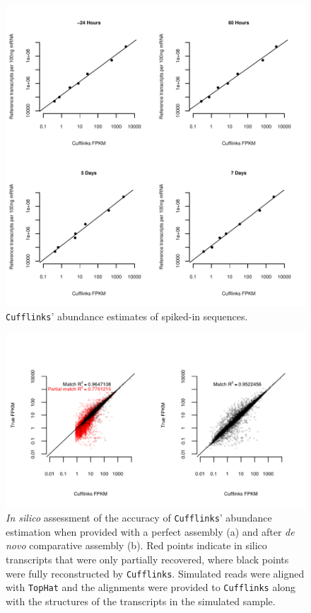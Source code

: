 \documentclass[12pt]{amsart}
\theoremstyle{definition}
\begin{document}
\begin{figure}[h] 
    \includegraphics{pdfs/spikes.pdf}
    \caption[{\tt Cufflinks}' abundance estimates of spiked-in sequences]{{\tt Cufflinks}' abundance estimates of spiked-in sequences.\label{spikes}}
\end{figure}

\begin{figure}[h] 
    \includegraphics[scale=0.5]{pdfs/sim_small.pdf}
    \caption[Accuracy of {\tt Cufflinks} abundance estimates]{\emph{In silico} assessment of the accuracy of {\tt Cufflinks}’  abundance estimation when provided with a perfect assembly (a) and after {\it de novo} comparative assembly (b). Red points indicate in silico transcripts that were only partially recovered, where black points were fully reconstructed by {\tt Cufflinks}. Simulated reads were aligned with {\tt TopHat} and the alignments were provided to {\tt Cufflinks} along with the structures of the transcripts in the simulated sample. \label{sim}}
\end{figure}
\end{document}
